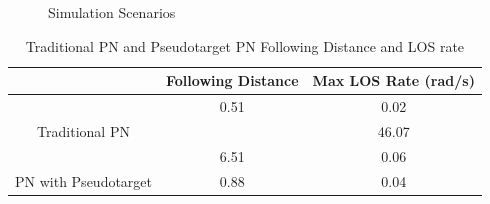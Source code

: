 \documentclass[]{aiaa-tc}%
\begin{document}
\begin{figure}[H]
\begin{subfigmatrix}{2}
  \hspace*{0mm}
 \end{subfigmatrix}
 \caption{Simulation Scenarios}
 \label{fig:compwithpt}
\end{figure}

\begin{table}[H]
\centering
\caption{Traditional PN and Pseudotarget PN Following Distance and LOS rate}
\label{my-label}
\begin{tabular}{c|c|c|}
\cline{2-3}
\multicolumn{1}{l|}{}                                        & \multicolumn{1}{l|}{Following Distance} & \multicolumn{1}{l|}{Max LOS Rate (rad/s)} \\ \hline
\multicolumn{1}{|c|}{}                                       & 0.51                                    & 0.02                                      \\ \cline{2-3} 
\multicolumn{1}{|c|}{\multirow{-2}{*}{Traditional PN}}       & \cellcolor[HTML]{C0C0C0}                & 46.07                                     \\ \hline
\multicolumn{1}{|c|}{}                                       & 6.51                                    & 0.06                                      \\ \cline{2-3} 
\multicolumn{1}{|c|}{\multirow{-2}{*}{PN with Pseudotarget}} & 0.88                                    & 0.04                                      \\ \hline
\end{tabular}
\end{table}
\end{document}
